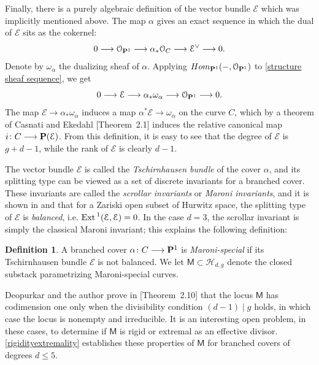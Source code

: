 \documentclass[reqno, 10 pt]{article}
\theoremstyle{definition}
\newtheorem{defn}[thm]{Definition}
\theoremstyle{remark}
\numberwithin{equation}{section}
\numberwithin{thm}{section}
\numberwithin{prop}{section}
\numberwithin{lem}{section}
\numberwithin{cor}{section}
\numberwithin{conj}{section}
\numberwithin{defn}{section}
\renewcommand{\H}{\mathcal H}
\renewcommand{\to}{\longrightarrow}
\newcommand{\sfM}{{\mathsf M}}
\newcommand{\cE}{{\mathcal E}}
\newcommand{\cO}{{\mathcal O}}
\renewcommand{\P}{{\bf P}}
\newcommand {\from}{{\colon}}
\renewcommand{\H}{{\mathcal{H}}}
\newcommand {\Ext}{{\rm Ext \,}}
\begin{document}
Finally, there is a purely algebraic definition of the vector bundle $\cE$ which was implicitly mentioned above. The map $\alpha$ gives an exact sequence in which the dual of $\cE$ sits as the cokernel:
\begin{equation}\label{structure sheaf sequence}
  0 \to \cO_{\P^{1}} \to \alpha_* \cO_{C} \to {\cE}^\vee \to 0.
\end{equation}
 Denote by $\omega_\alpha$ the dualizing sheaf of $\alpha$. Applying $Hom_{\P^{1}}(-,\cO_{\P^{1}})$ to \eqref{structure sheaf sequence}, we get
\begin{equation}\label{dual structure sheaf sequence}
  0 \to \cE \to \alpha_* \omega_\alpha \to \cO_{\P^{1}} \to 0.
\end{equation}
The map $\cE \to \alpha_* \omega_\alpha$ induces a map $\alpha^* \cE \to \omega_\alpha$ on the curve $C$, which by a theorem of Casnati and Ekedahl \cite{casnati96:_cover_of_algeb_variet_i}[Theorem~2.1] induces the relative canonical map $i \from C \to \P(\cE)$.  From this definition, it is easy to see that the degree of $\cE$ is $g+d-1$, while the rank of $\cE$ is clearly $d-1$.


The vector bundle $\cE$ is called the {\sl Tschirnhausen bundle} of the cover $\alpha$, and its splitting type can be viewed as a set of discrete invariants for a branched cover. These invariants are called the {\sl scrollar invariants} or {\sl Maroni invariants}, and it is shown in \cite{coppens_existence} and \cite{ballico-scrollar} that for a Zariski open subset of Hurwitz space, the splitting type of $\cE$ is {\sl balanced}, i.e. $\Ext^{1}(\cE,\cE) = 0$. In the case $d = 3$, the scrollar invariant is simply the classical Maroni invariant; this explains the following definition:

\begin{defn}\label{defn:Mspecial}
A branched cover $\alpha \from C \to \P^{1}$ is {\sl Maroni-special} if its Tschirnhausen bundle $\cE$ is not balanced. We let ${\mathsf M} \subset \H_{d,g}$ denote the closed substack parametrizing Maroni-special curves.
\end{defn}

Deopurkar and the author prove in \cite{dp:pic_345}[Theorem~2.10] that the locus $\sfM$ has codimension one only when the divisibility condition $(d-1) \mid g$ holds, in which case the locus is nonempty and irreducible. It is an interesting open problem, in these cases, to determine if $\sfM$ is rigid or extremal as an effective divisor.  \autoref{rigidityextremality} establishes these properties of $\sfM$ for branched covers of degrees $d \leq 5$.
\end{document}
